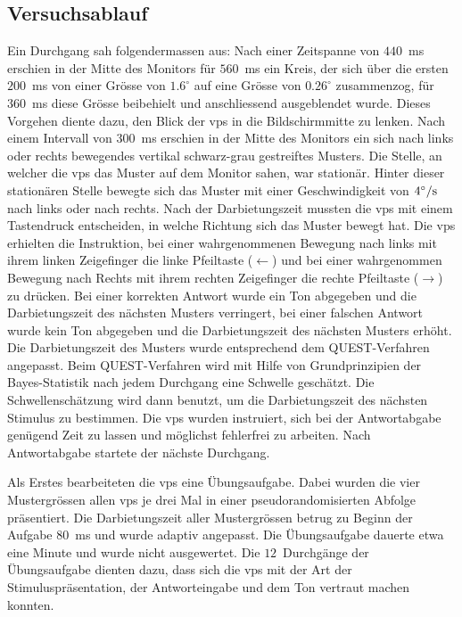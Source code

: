 \documentclass[11pt, twoside, a4paper]{book}		%
\begin{document}
\subsection{Versuchsablauf \label{subsec:Prozedur}}

Ein Durchgang sah folgendermassen aus: Nach einer Zeitspanne von $440$~ms erschien in der Mitte des Monitors für $560$~ms ein Kreis, der sich über die ersten $200$~ms von einer Grösse von $1.6^{\circ}$ auf eine Grösse von $0.26^{\circ}$ zusammenzog, für $360$~ms diese Grösse beibehielt und anschliessend ausgeblendet wurde. Dieses Vorgehen diente dazu, den Blick der \glspl{vp} in die Bildschirmmitte zu lenken. Nach einem  Intervall von $300$~ms erschien in der Mitte des Monitors ein sich nach links oder rechts bewegendes vertikal schwarz-grau gestreiftes Musters. Die Stelle, an welcher die \glspl{vp} das Muster auf dem Monitor sahen, war stationär. Hinter dieser stationären Stelle bewegte sich das Muster mit einer Geschwindigkeit von $4^\circ / \textnormal{s} $  nach links oder nach rechts. Nach der Darbietungszeit mussten die \glspl{vp} mit einem Tastendruck entscheiden, in welche Richtung sich das Muster bewegt hat. Die \glspl{vp} erhielten die Instruktion, bei einer wahrgenommenen Bewegung nach links mit ihrem linken Zeigefinger die linke Pfeiltaste ($\leftarrow$) und bei einer wahrgenommen Bewegung nach Rechts mit ihrem rechten Zeigefinger die rechte Pfeiltaste ($\rightarrow$) zu drücken. 
Bei einer korrekten Antwort wurde ein Ton abgegeben und die Darbietungszeit des nächsten Musters verringert, bei einer falschen Antwort wurde kein Ton abgegeben und die Darbietungszeit des nächsten Musters erhöht. Die Darbietungszeit des Musters wurde entsprechend dem QUEST-Verfahren \citep{Watson1983} angepasst. Beim QUEST-Verfahren wird mit Hilfe von Grundprinzipien der Bayes-Statistik nach jedem Durchgang eine Schwelle geschätzt. Die Schwellenschätzung wird dann benutzt, um die Darbietungszeit des nächsten Stimulus zu bestimmen. Die \glspl{vp} wurden instruiert, sich bei der Antwortabgabe genügend Zeit zu lassen und möglichst fehlerfrei zu arbeiten. Nach Antwortabgabe startete der nächste Durchgang.

Als Erstes bearbeiteten die \glspl{vp} eine Übungsaufgabe. Dabei wurden die vier Mustergrössen allen \glspl{vp} je drei Mal  in einer pseudorandomisierten Abfolge präsentiert. Die Darbietungszeit aller Mustergrössen betrug zu Beginn der Aufgabe $80$~ms und wurde adaptiv angepasst. Die Übungsaufgabe dauerte etwa eine Minute und wurde nicht ausgewertet. Die $12$~Durchgänge der Übungsaufgabe dienten dazu, dass sich die \glspl{vp} mit der Art der Stimuluspräsentation, der Antworteingabe und dem Ton vertraut machen konnten. 
\end{document}
